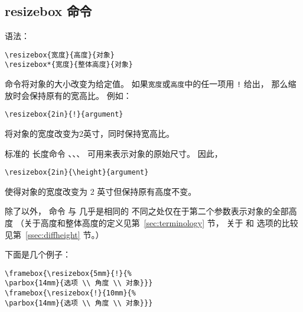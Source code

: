 \subsection{resizebox 命令}\label{ssec:resizebox}
语法：
\begin{lstlisting}
\resizebox{宽度}{高度}{对象}
\resizebox*{宽度}{整体高度}{对象}
\end{lstlisting}

 命令将对象的大小改变为给定值。
如果\texttt{宽度}或\texttt{高度}中的任一项用 \texttt{!} 给出，
那么缩放时会保持原有的宽高比。
例如：
\begin{lstlisting}
\resizebox{2in}{!}{argument}
\end{lstlisting}
将对象的宽度改变为2英寸，同时保持宽高比。

标准的 \LaTeXe{} 长度命令 、、、 可用来表示对象的原始尺寸。
因此，
\begin{lstlisting}
\resizebox{2in}{\height}{argument}
\end{lstlisting}
使得对象的宽度改变为 2 英寸但保持原有高度不变。 

除了以外，
命令  与  几乎是相同的
不同之处仅在于第二个参数表示对象的全部高度
（关于高度和整体高度的定义见第~\ref{sec:terminology} 节，
关于  和  选项的比较见第~\ref{ssec:diffheight} 节。）

下面是几个例子：

\begin{center}
\begin{minipage}[b]{.4\textwidth}
	\begin{center}
		\par\vspace{0pt}
	\end{center}
\end{minipage}%
\hspace{-1cm}
\begin{minipage}[b]{.6\textwidth}
\begin{lstlisting}
\framebox{\resizebox{5mm}{!}{%
\parbox{14mm}{选项 \\ 角度 \\ 对象}}}
\framebox{\resizebox{!}{10mm}{%
\parbox{14mm}{选项 \\ 角度 \\ 对象}}}
\end{lstlisting}
\par\vspace{0pt}
\end{minipage}
\end{center}

